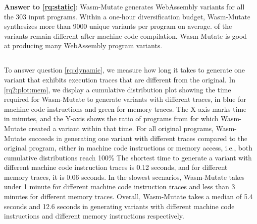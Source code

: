 \documentclass[a4paper,fleqn]{cas-dc}
\newcommand*\badge[1]{ \colorbox{red}{\color{white}#1}}
\newcommand{\tool}{{\sc Wasm-Mutate}\xspace}
\newcommand{\Wasm}{WebAssembly\xspace}
\newcommand{\wasm}{\Wasm}
\newcommand{\todo}[1]{%
\refstepcounter{todo}
\noindent\textbf{\badge{TODO}} {\color{red}#1}
\addcontentsline{td}{todo}
{\color{red}\thesection.\thetodo\xspace #1}}
\begin{document}






\begin{tcolorbox}[boxrule=1pt,arc=.3em,boxsep=-1.3mm]
  \textbf{Answer to \ref{rq:static}}: \tool generates \wasm variants for all the 303 input programs. 
  Within a one-hour diversification budget, \tool synthesizes more than 9000 unique variants per program on average. 
  \preserved of the variants remain different after machine-code compilation.
  \tool is good at producing many \Wasm program variants.
\end{tcolorbox}


\subsection{\rqdynamic}


To answer question \ref{rq:dynamic},   we measure how long it takes to generate one variant that exhibits execution traces that are different from the original.
In \autoref{rq2:plot:mem}, we display a cumulative distribution plot showing the time required for \tool to generate variants with different traces, in blue for machine code instructions and green for memory traces.
The X-axis marks time in minutes, and the Y-axis shows the ratio of programs from \nProgramsRosetta for which \tool created a variant within that time.
For all original programs, \tool succeeds in  generating one variant with different traces compared to the original program, either in machine code instructions or memory access, i.e., both cumulative distributions reach 100\%
The shortest time to generate a variant with different machine code instruction traces is 0.12 seconds, and for different memory traces, it is 0.06 seconds. 
In the slowest scenarios, \tool takes under 1 minute for different machine code instruction traces and less than 3 minutes for different memory traces.
Overall, \tool takes a median of 5.4 seconds and 12.6 seconds in generating variants with different machine code instructions and different memory instructions respectively.
\end{document}
